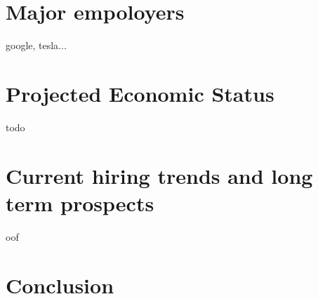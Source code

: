 \documentclass[letterpaper,12pt]{article}
\begin{document}
\section{Major empoloyers}
google, tesla...

\section{Projected Economic Status}
todo \cite{forbesprojected}

\section{Current hiring trends and long term prospects}
oof
\section{Conclusion}
\lipsum[1]


\singlespacing
\nocite{*}
\printbibliography
% 
% 
\end{document}
